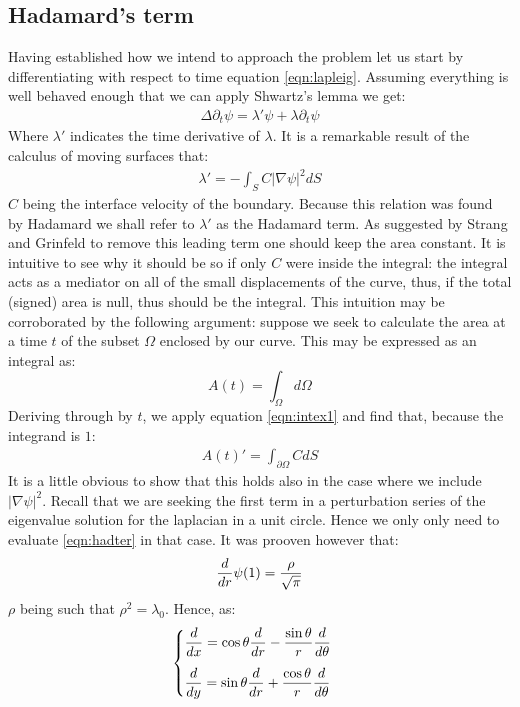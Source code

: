\documentclass[../main.tex]{subfiles}
\begin{document}
	\subsection{Hadamard's term}
		Having established how we intend to approach the problem let us start by differentiating with respect to time equation \ref{eqn:lapleig}. Assuming everything is well behaved enough that we can apply Shwartz's lemma we get:
		\begin{gather}
			\label{eqn:hadter}
			\Delta\partial_{t}\psi=\lambda'\psi+\lambda\partial_{t}\psi
		\end{gather}
		Where $ \lambda' $ indicates the time derivative of $ \lambda $. It is a remarkable result of the calculus of moving surfaces that:
		\begin{gather}
			\lambda'=-\int_{S}C\left|\nabla\psi\right|^{2}dS
		\end{gather}
		$ C $ being the interface velocity of the boundary. Because this relation was found by Hadamard we shall refer to $ \lambda' $ as the Hadamard term. As suggested by Strang and Grinfeld to remove this leading term one should keep the area constant. It is intuitive to see why it should be so if only $ C $ were inside the integral: the integral acts as a mediator on all of the small displacements of the curve, thus, if the total (signed) area is null, thus should be the integral. This intuition may be corroborated by the following argument: suppose we seek to calculate the area at a time $ t $ of the subset $ \Omega $ enclosed by our curve. This may be expressed as an integral as:
		\begin{equation}
			A(t)=\int_{\Omega}d\Omega
		\end{equation}
		Deriving through by $ t $, we apply equation \ref{eqn:intex1} and find that, because the integrand is $ 1 $:
		\begin{gather}
			A(t)'=\int_{\partial\Omega}CdS
		\end{gather}
		It is a little obvious to show that this holds also in the case where we include $ \left|\nabla\psi\right|^{2} $. Recall that we are seeking the first term in a perturbation series of the eigenvalue solution for the laplacian in a unit circle. Hence we only only need to evaluate \ref{eqn:hadter} in that case. It was prooven however that:
		\begin{gather}
		\dfrac{d}{dr}\psi(1)=\dfrac{\rho}{\sqrt{\pi}}
		\end{gather}
		$ \rho $ being such that $ \rho^{2}=\lambda_{0} $. Hence, as:
		\begin{gather}
			\begin{cases}
			\der{}{x}=\cos\theta\der{}{r}-\dfrac{\sin\theta}{r}\der{}{\theta}			\vspace{3mm}\\
			\der{}{y}=\sin\theta\der{}{r}+\dfrac{\cos\theta}{r}\der{}{\theta}
			\end{cases}
		\end{gather}
\end{document}
